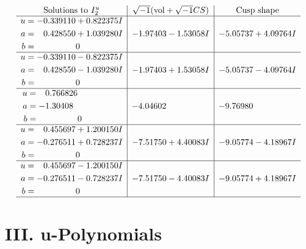 \documentclass[1p]{elsarticle_modified}
\theoremstyle{definition}
\newcommand{\I}{\sqrt{-1}}
\begin{document}
$$\begin{array}{c|c|c}  
\text{Solutions to }I^u_{2}& \I (\text{vol} + \sqrt{-1}CS) & \text{Cusp shape}\\
 \hline 
\begin{aligned}
u &= -0.339110 + 0.822375 I \\
a &= \phantom{-}0.428550 + 1.039280 I \\
b &= \phantom{-0.000000 } 0\end{aligned}
 & -1.97403 - 1.53058 I & -5.05737 + 4.09764 I \\ \hline\begin{aligned}
u &= -0.339110 - 0.822375 I \\
a &= \phantom{-}0.428550 - 1.039280 I \\
b &= \phantom{-0.000000 } 0\end{aligned}
 & -1.97403 + 1.53058 I & -5.05737 - 4.09764 I \\ \hline\begin{aligned}
u &= \phantom{-}0.766826\phantom{ +0.000000I} \\
a &= -1.30408\phantom{ +0.000000I} \\
b &= \phantom{-0.000000 } 0\end{aligned}
 & -4.04602\phantom{ +0.000000I} & -9.76980\phantom{ +0.000000I} \\ \hline\begin{aligned}
u &= \phantom{-}0.455697 + 1.200150 I \\
a &= -0.276511 + 0.728237 I \\
b &= \phantom{-0.000000 } 0\end{aligned}
 & -7.51750 + 4.40083 I & -9.05774 - 4.18967 I \\ \hline\begin{aligned}
u &= \phantom{-}0.455697 - 1.200150 I \\
a &= -0.276511 - 0.728237 I \\
b &= \phantom{-0.000000 } 0\end{aligned}
 & -7.51750 - 4.40083 I & -9.05774 + 4.18967 I\\
 \hline 
 \end{array}$$\newpage
\newpage\renewcommand{\arraystretch}{1}
\centering \section*{ III. u-Polynomials}
\end{document}
